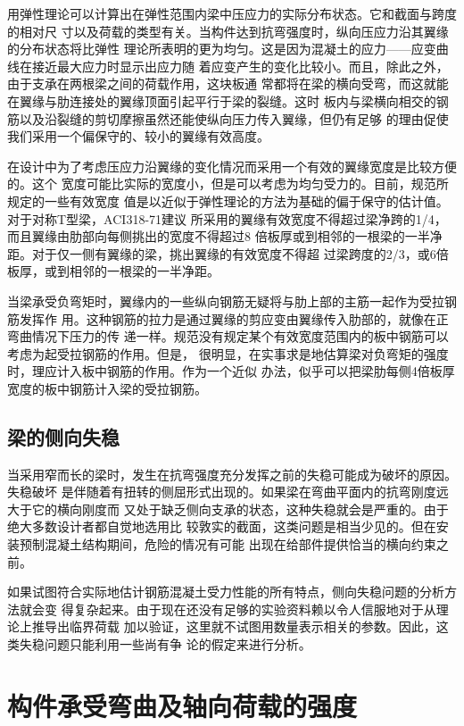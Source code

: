 \documentclass[12pt,a4paper]{book}
\begin{document}
用弹性理论可以计算出在弹性范围内梁中压应力的实际分布状态。它和截面与跨度的相对尺
寸以及荷载的类型有关。当构件达到抗弯强度时，纵向压应力沿其翼缘的分布状态将比弹性
理论所表明的更为均匀。这是因为混凝土的应力——应变曲线在接近最大应力时显示出应力随
着应变产生的变化比较小。而且，除此之外，由于支承在两根梁之间的荷载作用，这块板通
常都将在梁的横向受弯，而这就能在翼缘与肋连接处的翼缘顶面引起平行于梁的裂缝。这时
板内与梁横向相交的钢筋以及沿裂缝的剪切摩擦虽然还能使纵向压力传入翼缘，但仍有足够
的理由促使我们采用一个偏保守的、较小的翼缘有效高度。

在设计中为了考虑压应力沿翼缘的变化情况而采用一个有效的翼缘宽度是比较方便的。这个
宽度可能比实际的宽度小，但是可以考虑为均匀受力的。目前，规范所规定的一些有效宽度
值是以近似于弹性理论的方法为基础的偏于保守的估计值。对于对称T型梁，ACI318-71建议
所采用的翼缘有效宽度不得超过梁净跨的1/4，而且翼缘由肋部向每侧挑出的宽度不得超过8
倍板厚或到相邻的一根梁的一半净距。对于仅一侧有翼缘的梁，挑出翼缘的有效宽度不得超
过梁跨度的2/3，或6倍板厚，或到相邻的一根梁的一半净距。

当梁承受负弯矩时，翼缘内的一些纵向钢筋无疑将与肋上部的主筋一起作为受拉钢筋发挥作
用。这种钢筋的拉力是通过翼缘的剪应变由翼缘传入肋部的，就像在正弯曲情况下压力的传
递一样。规范没有规定某个有效宽度范围内的板中钢筋可以考虑为起受拉钢筋的作用。但是，
很明显，在实事求是地估算梁对负弯矩的强度时，理应计入板中钢筋的作用。作为一个近似
办法，似乎可以把梁肋每侧4倍板厚宽度的板中钢筋计入梁的受拉钢筋。

\section{梁的侧向失稳}

当采用窄而长的梁时，发生在抗弯强度充分发挥之前的失稳可能成为破坏的原因。失稳破坏
是伴随着有扭转的侧屈形式出现的。如果梁在弯曲平面内的抗弯刚度远大于它的横向刚度而
又处于缺乏侧向支承的状态，这种失稳就会是严重的。由于绝大多数设计者都自觉地选用比
较敦实的截面，这类问题是相当少见的。但在安装预制混凝土结构期间，危险的情况有可能
出现在给部件提供恰当的横向约束之前。

如果试图符合实际地估计钢筋混凝土受力性能的所有特点，侧向失稳问题的分析方法就会变
得复杂起来。由于现在还没有足够的实验资料赖以令人信服地对于从理论上推导出临界荷载
加以验证，这里就不试图用数量表示相关的参数。因此，这类失稳问题只能利用一些尚有争
论的假定来进行分析。

\chapter{构件承受弯曲及轴向荷载的强度}
\end{document}
